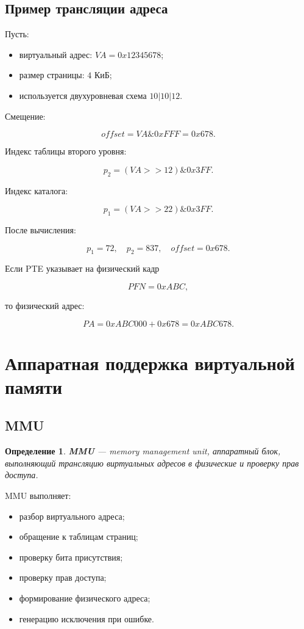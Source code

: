 \documentclass[a4paper,12pt]{article}
\newtheorem{definition}{Определение}
\begin{document}
\subsection{Пример трансляции адреса}

Пусть:

\begin{itemize}
    \item виртуальный адрес: $VA = 0x12345678$;
    \item размер страницы: $4$ КиБ;
    \item используется двухуровневая схема $10|10|12$.
\end{itemize}

Смещение:

\[
offset = VA \& 0xFFF = 0x678.
\]

Индекс таблицы второго уровня:

\[
p_2 = (VA >> 12) \& 0x3FF.
\]

Индекс каталога:

\[
p_1 = (VA >> 22) \& 0x3FF.
\]

После вычисления:

\[
p_1 = 72,\quad p_2 = 837,\quad offset = 0x678.
\]

Если PTE указывает на физический кадр

\[
PFN = 0xABC,
\]

то физический адрес:

\[
PA = 0xABC000 + 0x678 = 0xABC678.
\]

\section{Аппаратная поддержка виртуальной памяти}

\subsection{MMU}

\begin{definition}
\textbf{MMU} --- memory management unit, аппаратный блок, выполняющий трансляцию виртуальных адресов в физические и проверку прав доступа.
\end{definition}

MMU выполняет:

\begin{itemize}
    \item разбор виртуального адреса;
    \item обращение к таблицам страниц;
    \item проверку бита присутствия;
    \item проверку прав доступа;
    \item формирование физического адреса;
    \item генерацию исключения при ошибке.
\end{itemize}
\end{document}
